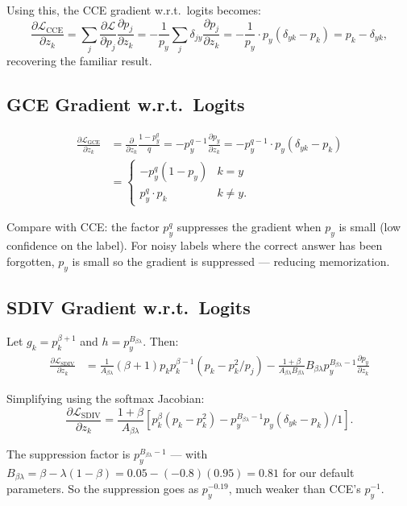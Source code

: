 \documentclass[11pt,a4paper]{article}
\newcommand{\Lcal}{\mathcal{L}}
\newcommand{\py}{p_y}
\newcommand{\Asd}{A_{\beta\lambda}}
\newcommand{\Bsd}{B_{\beta\lambda}}
\begin{document}
Using this, the CCE gradient w.r.t.\ logits becomes:
\[
  \frac{\partial \Lcal_{\mathrm{CCE}}}{\partial z_k} = \sum_j \frac{\partial \Lcal}{\partial p_j}\frac{\partial p_j}{\partial z_k}
  = -\frac{1}{\py}\sum_j \delta_{jy}\frac{\partial p_j}{\partial z_k}
  = -\frac{1}{\py}\cdot \py(\delta_{yk} - p_k)
  = p_k - \delta_{yk},
\]
recovering the familiar result.

\subsection{GCE Gradient w.r.t.\ Logits}

\begin{align}
  \frac{\partial \Lcal_{\mathrm{GCE}}}{\partial z_k}
  &= \frac{\partial}{\partial z_k}\frac{1-\py^q}{q}
  = -p_y^{q-1}\frac{\partial p_y}{\partial z_k}
  = -p_y^{q-1}\cdot p_y(\delta_{yk} - p_k) \\
  &= \begin{cases}
  -p_y^q(1-p_y) & k=y \\
  p_y^q\cdot p_k & k\neq y.
  \end{cases}
\end{align}

Compare with CCE: the factor $p_y^q$ suppresses the gradient when $p_y$ is small
(low confidence on the label). For noisy labels where the correct answer has been
forgotten, $p_y$ is small so the gradient is suppressed --- reducing memorization.

\subsection{SDIV Gradient w.r.t.\ Logits}

Let $g_k = p_k^{\beta+1}$ and $h = p_y^{\Bsd}$. Then:
\begin{align}
  \frac{\partial \Lcal_{\mathrm{SDIV}}}{\partial z_k}
  &= \frac{1}{\Asd}(\beta+1)p_k p_k^{\beta-1}(p_k - p_k^2/p_j) - \frac{1+\beta}{\Asd\Bsd}\Bsd p_y^{\Bsd-1}\frac{\partial p_y}{\partial z_k}
\end{align}

Simplifying using the softmax Jacobian:
\begin{equation}
  \frac{\partial \Lcal_{\mathrm{SDIV}}}{\partial z_k}
  = \frac{1+\beta}{\Asd}\left[p_k^\beta(p_k - p_k^2) - p_y^{\Bsd-1}p_y(\delta_{yk}-p_k)/1\right].
\end{equation}

The suppression factor is $p_y^{\Bsd-1}$ — with $\Bsd = \beta - \lambda(1-\beta) = 0.05 - (-0.8)(0.95) = 0.81$
for our default parameters. So the suppression goes as $p_y^{-0.19}$, much weaker than
CCE's $p_y^{-1}$.
\end{document}
